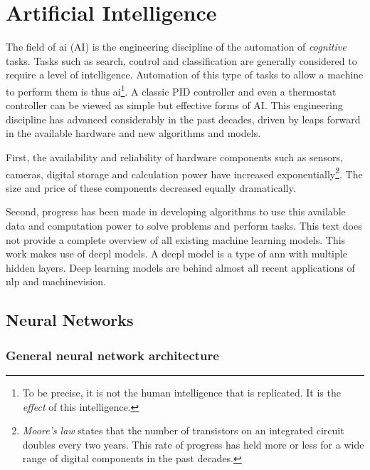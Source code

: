 \section{Artificial Intelligence}
\par{
    The field of \Gls{ai} (AI) is the engineering discipline of the automation of \textit{cognitive} tasks.
    Tasks such as search, control and classification are generally considered to require a level of intelligence. 
    Automation of this type of tasks to allow a machine to perform them is thus \Gls{ai}\footnote{To be precise, it is not the human intelligence that is replicated. It is the \textit{effect} of this intelligence.}.
    A classic PID controller and even a thermostat controller can be viewed as simple but effective forms of AI.
    This engineering discipline has advanced considerably in the past decades, driven by leaps forward in the available hardware and new algorithms and models. 
}
\par{
    First, the availability and reliability of hardware components such as sensors, cameras, digital storage and calculation power have increased exponentially\footnote{ \textit{Moore's law} states that the number of transistors on an integrated circuit doubles every two years. This rate of progress has held more or less for a wide range of digital components in the past decades.}.
    The size and price of these components decreased equally dramatically. }
\par{
    Second, progress has been made in developing algorithms to use this available data and computation power to solve problems and perform tasks.
    This text does not provide a complete overview of all existing machine learning models. 
    This work makes use of \Gls{deepl} models.
    A \Gls{deepl} model is a type of \acrfull{ann} with multiple hidden layers. 
    Deep learning models are behind almost all recent applications of \acrfull{nlp} and \Gls{machinevision}.
}

\subsection{Neural Networks}
\subsubsection{General neural network architecture}

